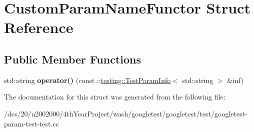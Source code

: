 \hypertarget{structCustomParamNameFunctor}{}\section{Custom\+Param\+Name\+Functor Struct Reference}
\label{structCustomParamNameFunctor}
\subsection*{Public Member Functions}
\begin{DoxyCompactItemize}
\item 
\mbox{\label{structCustomParamNameFunctor_a364d073efd6cb9a05e9d1c97565288ef}} 
std\+::string {\bfseries operator()} (const \+::\mbox{\hyperlink{structtesting_1_1TestParamInfo}{testing\+::\+Test\+Param\+Info}}$<$ std\+::string $>$ \&inf)
\end{DoxyCompactItemize}


The documentation for this struct was generated from the following file\+:\begin{DoxyCompactItemize}
\item 
/dcs/20/u2002000/4th\+Year\+Project/wash/googletest/googletest/test/googletest-\/param-\/test-\/test.\+cc\end{DoxyCompactItemize}
